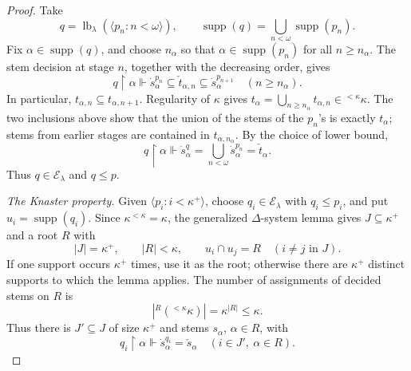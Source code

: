 \documentclass[11pt,a4paper]{amsart}
\theoremstyle{definition}
\theoremstyle{remark}
\DeclareMathOperator{\supp}{supp}
\begin{document}
\begin{proof}
Take
\[
 q=\operatorname{lb}_\lambda(\langle p_n:n<\omega\rangle),
 \qquad \supp(q)=\bigcup_{n<\omega}\supp(p_n).
\]
Fix \(\alpha\in\supp(q)\), and choose \(n_\alpha\) so
that \(\alpha\in\supp(p_n)\) for all \(n\geq n_\alpha\).
The stem decision at stage \(n\), together with the decreasing order,
gives
\[
 q\restriction\alpha\Vdash
 \dot s_\alpha^{p_n}\subseteq\check t_{\alpha,n}
                     \subseteq\dot s_\alpha^{p_{n+1}}
                               \quad(n\geq n_\alpha).
\]
In particular, \(t_{\alpha,n}\subseteq t_{\alpha,n+1}\).
Regularity of \(\kappa\) gives
\(t_\alpha=\bigcup_{n\geq n_\alpha}t_{\alpha,n}
\in{}^{<\kappa}\kappa\). The two inclusions above show that
the union of the stems of the \(p_n\)'s is exactly
\(t_\alpha\); stems from earlier stages are contained in
\(t_{\alpha,n_\alpha}\). By the choice of lower bound,
\[
 q\restriction\alpha\Vdash
 \dot s_\alpha^q=\bigcup_{n<\omega}\dot s_\alpha^{p_n}
                                      =\check t_\alpha.
\]
Thus \(q\in\mathcal E_\lambda\) and \(q\leq p\).

\emph{The Knaster property.}
Given \(\langle p_i:i<\kappa^+\rangle\), choose
\(q_i\in\mathcal E_\lambda\) with \(q_i\leq p_i\),
and put \(u_i=\supp(q_i)\). Since
\(\kappa^{<\kappa}=\kappa\), the generalized
\(\Delta\)-system lemma gives \(J\subseteq\kappa^+\)
and a root \(R\) with
\[
 |J|=\kappa^+,\qquad |R|<\kappa,\qquad
 u_i\cap u_j=R\quad(i\neq j\text{ in }J).
\]
If one support occurs \(\kappa^+\) times, use it as the root;
otherwise there are \(\kappa^+\) distinct supports to which the
lemma applies. The number of assignments
of decided stems on \(R\) is
\[
 \left|{}^R({}^{<\kappa}\kappa)\right|
                              =\kappa^{|R|}\leq\kappa.
\]
Thus there is \(J'\subseteq J\) of size \(\kappa^+\)
and stems \(s_\alpha\), \(\alpha\in R\), with
\[
 q_i\restriction\alpha\Vdash
                      \dot s_\alpha^{q_i}=\check s_\alpha
                              \quad(i\in J',\ \alpha\in R).
\]


\end{proof}
\end{document}
